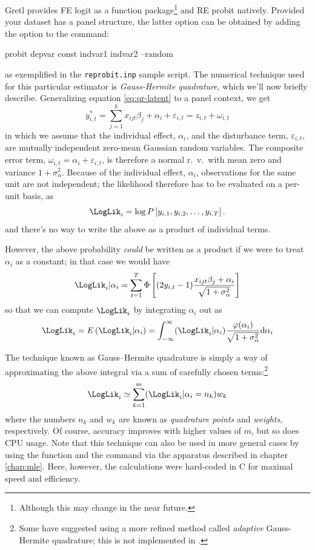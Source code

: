 Gretl provides FE logit as a function package\footnote{Although this
  may change in the near future.} and RE probit natively. Provided
your dataset has a panel structure, the latter option can be obtained
by adding the  option to the  command:
\begin{code}
  probit depvar const indvar1 indvar2 --random
\end{code}
as exemplified in the \texttt{reprobit.inp} sample script. The
numerical technique used for this particular estimator is
\emph{Gauss-Hermite quadrature}, which we'll now briefly
describe. Generalizing equation \eqref{eq:qr-latent} to a panel
context, we get
\begin{equation}
  y^*_{i,t} = \sum_{j=1}^k x_{ijt} \beta_j + \alpha_i + \varepsilon_{i,t} = z_{i,t}  +
  \omega_{i,t} 
\end{equation}
in which we assume that the individual effect, $\alpha_i$, and the
disturbance term, $\varepsilon_{i,t}$, are mutually independent
zero-mean Gaussian random variables. The composite error term,
$\omega_{i,t} = \alpha_i + \varepsilon_{i,t}$, is therefore a normal
r.~v.~with mean zero and variance $1 + \sigma^2_{\alpha}$. Because of
the individual effect, $\alpha_i$, observations for the same unit are
not independent; the likelihood therefore has to be evaluated on a
per-unit basis, as
\[
\LogLik_i = \log P\left[ y_{i,1}, y_{i,2}, \ldots , y_{i,T}\right] .
\]
and there's no way to write the above as a product of individual
terms.

However, the above probability \emph{could} be written as a product if
we were to treat $\alpha_i$ as a constant; in that case we would have
\[
\LogLik_i | \alpha_i = \sum_{t=1}^T 
\Phi\left[ 
(2 y_{i,t} - 1) \frac{x_{ijt} \beta_j + \alpha_i}{\sqrt{1 + \sigma^2_{\alpha}}}
\right]
\]
so that we can compute $\LogLik_i$ by integrating $\alpha_i$ out as
\[
\LogLik_i = E\left( \LogLik_i | \alpha_i \right) =
\int_{-\infty}^{\infty} (\LogLik_i | \alpha_i)
\frac{\varphi(\alpha_i)}{\sqrt{1 + \sigma^2_{\alpha}}} \mathrm{d} \alpha_i 
\]

The technique known as Gauss--Hermite quadrature is simply a way of
approximating the above integral via a sum of carefully chosen
terms:\footnote{Some have suggested using a more refined method called
  \emph{adaptive} Gauss-Hermite quadrature; this is not implemented in
  .}
\[
\LogLik_i \simeq \sum_{k=1}^{m} (\LogLik_i | \alpha_i = n_k ) w_k
\]
where the numbers $n_k$ and $w_k$ are known as \emph{quadrature
  points} and \emph{weights}, respectively. Of course, accuracy
improves with higher values of $m$, but so does CPU usage. Note that
this technique can also be used in more general cases by using the
 function and the  command via the apparatus
described in chapter \ref{chap:mle}. Here, however, the calculations
were hard-coded in C for maximal speed and efficiency.

